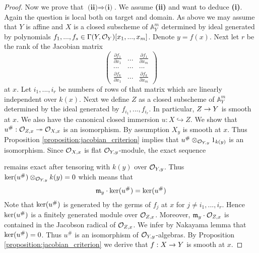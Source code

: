 \begin{proof}
Now we prove that $\textbf{(ii)}\Rightarrow \textbf{(i)}$. We assume \textbf{(ii)} and want to deduce \textbf{(i)}. Again the question is local both on target and domain.  As above we may assume that $Y$ is affine and $X$ is a closed subscheme of $\mathbb{A}^{m}_Y$ determined by ideal generated by polynomials $f_1,...,f_s\in \Gamma(Y,{\mathcal O}_Y)[x_1,...,x_{m}]$. Denote $y = f(x)$. Next let $r$ be the rank of the Jacobian matrix
$$\left( \begin{array}{ccc}
\frac{\partial f_1}{\partial x_1} & ... & \frac{\partial f_1}{\partial x_{m}} \\
... &...  &...  \\
\frac{\partial f_k}{\partial x_{1}} &...  & \frac{\partial f_k}{\partial x_{m}}\end{array} \right)$$
at $x$. Let $i_1,...,i_r$ be numbers of rows of that matrix which are linearly independent over $k(x)$. Next we define $Z$ as a closed subscheme of $\mathbb{A}^m_Y$ determined by the ideal generated by $f_{i_1},...,f_{i_r}$. In particular, $Z\rightarrow Y$ is smooth at $x$. We also have the canonical closed immersion $u:X\hookrightarrow Z$. We show that $u^{\#}:{\mathcal O}_{Z,x} \twoheadrightarrow {\mathcal O}_{X,x} $ is an isomorphism. By assumption $X_{y}$ is smooth at $x$. Thus Proposition \ref{proposition:jacobian_criterion} implies that $u^{\#}\otimes_{{\mathcal O}_{Y,y}}1_{k(y)}$ is an isomorphism. Since ${\mathcal O}_{X,x}$ is flat ${\mathcal O}_{Y,y}$-module, the exact sequence
\begin{center}
\end{center}
remains exact after tensoring with $k(y)$ over ${\mathcal O}_{Y,y}$. Thus $\mathrm{ker}(u^{\#})\otimes_{{\mathcal O}_{Y,y}}k(y) = 0$ which means that
$$\mathfrak{m}_y\cdot \mathrm{ker}(u^{\#}) =\mathrm{ker}(u^{\#})$$
Note that $\mathrm{ker}(u^{\#})$ is generated by the germs of $f_j$ at $x$ for $j\neq i_1,...,i_r$. Hence $\mathrm{ker}(u^{\#})$ is a finitely generated module over ${\mathcal O}_{Z,x}$. Moreover, $\mathfrak{m}_y\cdot {\mathcal O}_{Z,x}$ is contained in the Jacobson radical of ${\mathcal O}_{Z,x}$. We infer by Nakayama lemma that $\mathrm{ker}(u^{\#}) = 0$. Thus $u^{\#}$ is an isomorphism of ${\mathcal O}_{Y,y}$-algebras. By Proposition \ref{proposition:jacobian_criterion} we derive that $f:X\rightarrow Y$ is smooth at $x$.
\end{proof}

